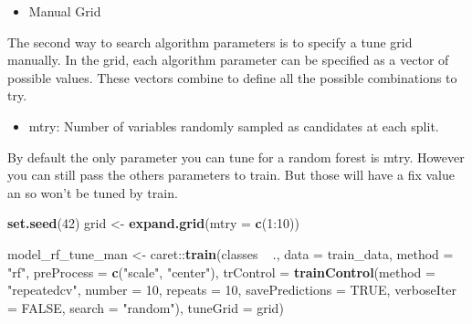 \documentclass[]{article}
\newenvironment{Shaded}{\begin{snugshade}}{\end{snugshade}}
\newcommand{\KeywordTok}[1]{\textcolor[rgb]{0.13,0.29,0.53}{\textbf{{#1}}}}
\newcommand{\DataTypeTok}[1]{\textcolor[rgb]{0.13,0.29,0.53}{{#1}}}
\newcommand{\DecValTok}[1]{\textcolor[rgb]{0.00,0.00,0.81}{{#1}}}
\newcommand{\StringTok}[1]{\textcolor[rgb]{0.31,0.60,0.02}{{#1}}}
\newcommand{\OtherTok}[1]{\textcolor[rgb]{0.56,0.35,0.01}{{#1}}}
\newcommand{\NormalTok}[1]{{#1}}
\providecommand{\tightlist}{%
  \setlength{\itemsep}{0pt}\setlength{\parskip}{0pt}}
\begin{document}
\begin{itemize}
\tightlist
\item
  Manual Grid
\end{itemize}

The second way to search algorithm parameters is to specify a tune grid
manually. In the grid, each algorithm parameter can be specified as a
vector of possible values. These vectors combine to define all the
possible combinations to try.

\begin{itemize}
\tightlist
\item
  mtry: Number of variables randomly sampled as candidates at each
  split.
\end{itemize}

By default the only parameter you can tune for a random forest is mtry.
However you can still pass the others parameters to train. But those
will have a fix value an so won't be tuned by train.

\begin{Shaded}
\begin{Highlighting}[]
\KeywordTok{set.seed}\NormalTok{(}\DecValTok{42}\NormalTok{)}
\NormalTok{grid <-}\StringTok{ }\KeywordTok{expand.grid}\NormalTok{(}\DataTypeTok{mtry =} \KeywordTok{c}\NormalTok{(}\DecValTok{1}\NormalTok{:}\DecValTok{10}\NormalTok{))}

\NormalTok{model_rf_tune_man <-}\StringTok{ }\NormalTok{caret::}\KeywordTok{train}\NormalTok{(classes ~}\StringTok{ }\NormalTok{.,}
                         \DataTypeTok{data =} \NormalTok{train_data,}
                         \DataTypeTok{method =} \StringTok{"rf"}\NormalTok{,}
                         \DataTypeTok{preProcess =} \KeywordTok{c}\NormalTok{(}\StringTok{"scale"}\NormalTok{, }\StringTok{"center"}\NormalTok{),}
                         \DataTypeTok{trControl =} \KeywordTok{trainControl}\NormalTok{(}\DataTypeTok{method =} \StringTok{"repeatedcv"}\NormalTok{, }
                                                  \DataTypeTok{number =} \DecValTok{10}\NormalTok{, }
                                                  \DataTypeTok{repeats =} \DecValTok{10}\NormalTok{, }
                                                  \DataTypeTok{savePredictions =} \OtherTok{TRUE}\NormalTok{, }
                                                  \DataTypeTok{verboseIter =} \OtherTok{FALSE}\NormalTok{,}
                                                  \DataTypeTok{search =} \StringTok{"random"}\NormalTok{),}
                         \DataTypeTok{tuneGrid =} \NormalTok{grid)}
\end{Highlighting}
\end{Shaded}
\end{document}
